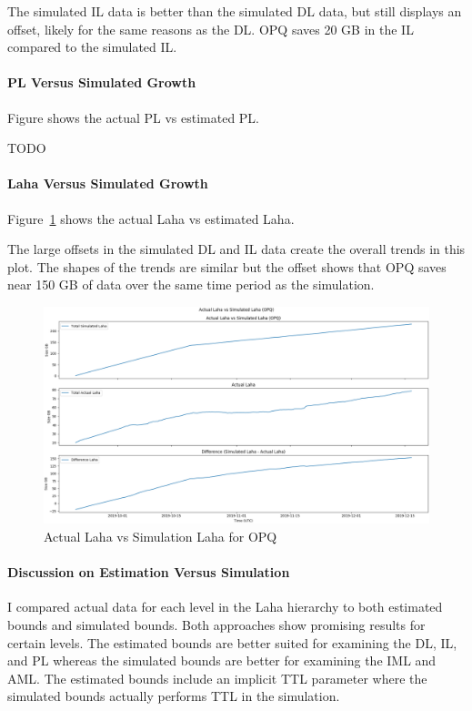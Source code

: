 The simulated IL data is better than the simulated DL data, but still displays an offset, likely for the same reasons as the DL. OPQ saves 20 GB in the IL compared to the simulated IL.

\paragraph{PL Versus Simulated Growth}
Figure shows the actual PL vs estimated PL.

TODO

\paragraph{Laha Versus Simulated Growth}
Figure~\ref{fig:actual_laha_vs_sim_opq} shows the actual Laha vs estimated Laha.

The large offsets in the simulated DL and IL data create the overall trends in this plot. The shapes of the trends are similar but the offset shows that OPQ saves near 150 GB of data over the same time period as the simulation.

\begin{figure}[H]
    \centering
    \includegraphics[width=\linewidth]{figures/actual_laha_vs_sim_opq.png}
    \caption{Actual Laha vs Simulation Laha for OPQ}
    \label{fig:actual_laha_vs_sim_opq}
\end{figure}

\paragraph{Discussion on Estimation Versus Simulation}

I compared actual data for each level in the Laha hierarchy to both estimated bounds and simulated bounds. Both approaches show promising results for certain levels. The estimated bounds are better suited for examining the DL, IL, and PL whereas the simulated bounds are better for examining the IML and AML. The estimated bounds include an implicit TTL parameter where the simulated bounds actually performs TTL in the simulation.

